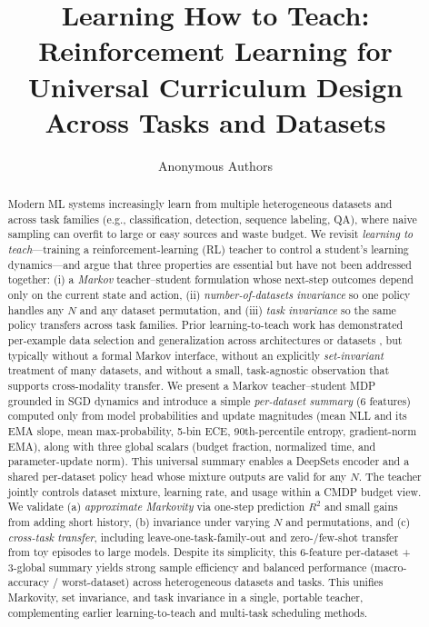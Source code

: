 \documentclass[11pt]{article}
\title{\textbf{Learning How to Teach: \\Reinforcement Learning for Universal Curriculum Design Across Tasks and Datasets}}
\author{Anonymous Authors}
\date{}
\newcommand{\1}{\mathbf{1}}
\begin{document}
\maketitle

\begin{abstract}
Modern ML systems increasingly learn from multiple heterogeneous datasets and across task families (e.g., classification, detection, sequence labeling, QA), where naive sampling can overfit to large or easy sources and waste budget. We revisit \emph{learning to teach}---training a reinforcement-learning (RL) teacher to control a student's learning dynamics---and argue that three properties are essential but have not been addressed together: (i) a \emph{Markov} teacher--student formulation whose next-step outcomes depend only on the current state and action, (ii) \emph{number-of-datasets invariance} so one policy handles any $N$ and any dataset permutation, and (iii) \emph{task invariance} so the same policy transfers across task families. Prior learning-to-teach work has demonstrated per-example data selection and generalization across architectures or datasets \citep{fan2018l2t,wu2018l2tloss}, but typically without a formal Markov interface, without an explicitly \emph{set-invariant} treatment of many datasets, and without a small, task-agnostic observation that supports cross-modality transfer. We present a Markov teacher--student MDP grounded in SGD dynamics and introduce a simple \emph{per-dataset summary} (6 features) computed only from model probabilities and update magnitudes (mean NLL and its EMA slope, mean max-probability, 5-bin ECE, 90th-percentile entropy, gradient-norm EMA),
along with three global scalars (budget fraction, normalized time, and parameter-update norm). This universal summary enables a DeepSets encoder and a shared per-dataset policy head whose mixture outputs are valid for any $N$. The teacher jointly controls dataset mixture, learning rate, and usage within a CMDP budget view. We validate (a) \emph{approximate Markovity} via one-step prediction $R^2$ and small gains from adding short history, (b) invariance under varying $N$ and permutations, and (c) \emph{cross-task transfer}, including leave-one-task-family-out and zero-/few-shot transfer from toy episodes to large models. Despite its simplicity, this 6-feature per-dataset + 3-global summary yields strong sample efficiency and balanced performance (macro-accuracy / worst-dataset) across heterogeneous datasets and tasks. This unifies Markovity, set invariance, and task invariance in a single, portable teacher, complementing earlier learning-to-teach and multi-task scheduling methods.
\end{abstract}
\end{document}
